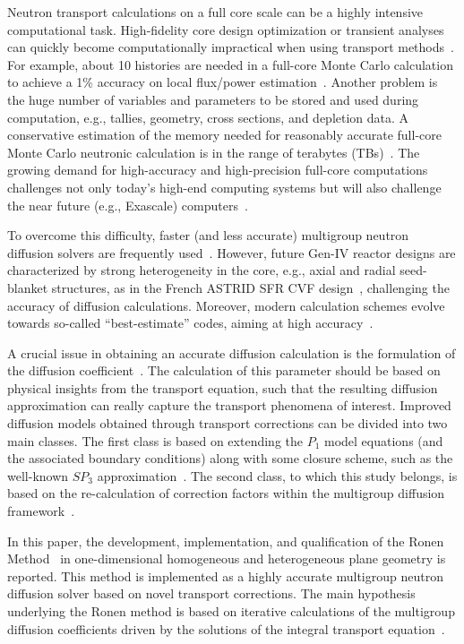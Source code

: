 Neutron transport calculations on a full core scale can be a highly intensive computational task. High-fidelity core design optimization or transient analyses can quickly become computationally impractical when using transport methods~\cite{Kim-2019}. For example, about 10 histories are needed in a full-core Monte Carlo calculation to achieve a 1\% accuracy on local flux/power estimation~\cite{Martin-2012}. Another problem is the huge number of variables and parameters to be stored and used during computation, e.g., tallies, geometry, cross sections, and depletion data. A conservative estimation of the memory needed for reasonably accurate full-core Monte Carlo neutronic calculation is in the range of terabytes (TBs)~\cite{Martin-2012}. The growing demand for high-accuracy and high-precision full-core computations challenges not only today’s high-end computing systems but will also challenge the near future (e.g., Exascale) computers~\cite{Martin-2012,Smith-2011,Kim-2019}.  

To overcome this difficulty, faster (and less accurate) multigroup neutron diffusion solvers are frequently used~\cite{Lawrence-1986,Smith-1986}. However, future Gen-IV reactor designs are characterized by strong heterogeneity in the core, e.g., axial and radial seed-blanket structures, as in the French ASTRID SFR CVF design~\cite{Bertrand-2016}, challenging the accuracy of diffusion calculations. Moreover, modern calculation schemes evolve towards so-called ``best-estimate'' codes, aiming at high accuracy~\cite{IAEA-BE-2008}. 

A crucial issue in obtaining an accurate diffusion calculation is the formulation of the diffusion coefficient~\cite{Bell-1970,Pounders-2009}. The calculation of this parameter should be based on physical insights from the transport equation, such that the resulting diffusion approximation can really capture the transport phenomena of interest. Improved diffusion models obtained through transport corrections can be divided into two main classes. The first class is based on extending the $P_1$ model equations (and the associated boundary conditions) along with some closure scheme, such as the well-known $SP_3$ approximation~\cite{Brantley-2000}. The second class, to which this study belongs, is based on the re-calculation of correction factors within the multigroup diffusion framework~\cite{Tomatis-2011}. 

In this paper, the development, implementation, and qualification of the Ronen Method~\cite{Ronen-2004} in one-dimensional homogeneous and heterogeneous plane geometry is reported. This method is implemented as a highly accurate multigroup neutron diffusion solver based on novel transport corrections. The main hypothesis underlying the Ronen method is based on iterative calculations of the multigroup diffusion coefficients driven by the solutions of the integral transport equation~\cite{Ronen-2004,Tomatis-2011}. 

